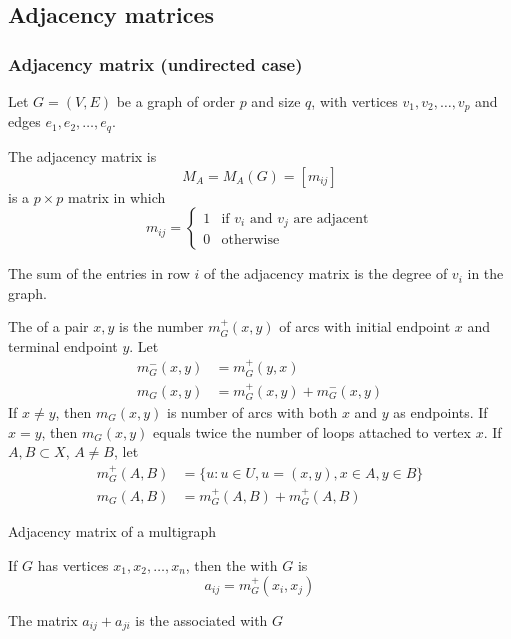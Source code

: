 \documentclass[aspectratio=43]{beamer}
\begin{document}
\subsection{Adjacency matrices}


\begin{frame}\frametitle{Adjacency matrix (undirected case)}
	Let $G=(V,E)$ be a graph of order $p$ and size $q$, with vertices $v_1, v_2, \dots , v_p$ and edges $e_1, e_2, \dots , e_q$.
	\begin{definition}
		The adjacency matrix is $$M_A=M_A(G)=[m_{ij}]$$ is a $p\times p$ matrix in which
		$$m_{ij}=\left \{ 
		\begin{array}{cc}
			1 & \textrm{if } v_i \textrm{ and } v_j \textrm{ are adjacent}\\
			0 & \textrm{otherwise}
		\end{array}
		\right .
		$$
	\end{definition}
\end{frame}

\begin{frame}
	\begin{theorem}
		The sum of the entries in row $i$ of the adjacency matrix is the degree of $v_i$ in the graph.
	\end{theorem}
\end{frame}

\begin{frame}
	\begin{definition}
		The  of a pair $x,y$ is the number $m_G^+(x,y)$ of arcs with initial endpoint $x$ and terminal endpoint $y$. Let
		\begin{align*}
			m_G^-(x,y) &= m_G^+(y,x) \\
			m_G(x,y) &= m_G^+(x,y)+m_G^-(x,y)
		\end{align*}
		If $x\neq y$, then $m_G(x,y)$ is number of arcs with both $x$ and $y$ as endpoints. If $x=y$, then $m_G(x,y)$ equals twice the number of loops attached to vertex $x$. If $A,B\subset X$, $A\neq B$, let
		\begin{align*}
			m_G^+(A,B) &= \{u:u\in U, u=(x,y),x\in A,y\in B\} \\
			m_G(A,B) &= m_G^+(A,B)+m_G^+(A,B)
		\end{align*}
	\end{definition}
\end{frame}

\begin{frame}{Adjacency matrix of a multigraph}
\begin{definition}
	If $G$ has vertices $x_1,x_2,\ldots,x_n$, then the  with $G$ is 
	\[
	a_{ij}=m_G^+(x_i,x_j)
	\]
\end{definition}
\vfill
\begin{definition}
	The matrix $a_{ij}+a_{ji}$ is the  associated with $G$
\end{definition}
\end{frame}
\end{document}
